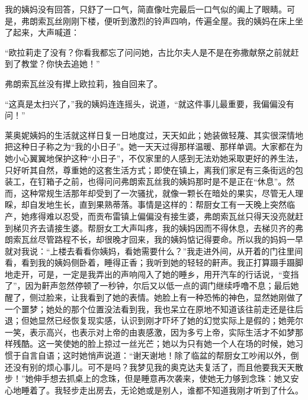 \par 我的姨妈没有回答，只舒了一口气，简直像吐完最后一口气似的阖上了眼睛。可是，弗朗索瓦丝刚刚下楼，便听到激烈的铃声四响，传遍全屋。我的姨妈在床上坐了起来，大声喊道：
\par “欧拉莉走了没有？你看我都忘了问问她，古比尔夫人是不是在弥撒献祭之前就赶到了教堂？你快去追她！”
\par 弗朗索瓦丝没有撵上欧拉莉，独自回来了。
\par “这真是太扫兴了，”我的姨妈连连摇头，说道，“就这件事儿最重要，我偏偏没有问！”
\par 莱奥妮姨妈的生活就这样日复一日地度过，天天如此；她装做轻蔑、其实很深情地把这种日子称之为“我的小日子”。她一天天过得那样温暖、那样单调。大家都在为她小心翼翼地保护这种“小日子”，不仅家里的人感到无法劝她采取更好的养生法，只好听其自然，尊重她的这套生活方式；即使在镇上，离我们家足有三条街远的包装工，在钉箱子之前，也得问问弗朗索瓦丝我的姨妈那时是不是正在“休息”。然而，这种常规生活那年却受到了一次骚扰，就像一颗长在暗处的果实，尽管无人理睬，却自发地生长，直到果熟蒂落。事情是这样的：帮厨女工有一天晚上突然临产，她疼得难以忍受，而贡布雷镇上偏偏没有接生婆，弗朗索瓦丝只得天没亮就赶到梯贝齐去请接生婆。帮厨女工大声叫疼，我的姨妈因而不得休息，去梯贝齐的弗朗索瓦丝尽管路程不长，却很晚才回来，我的姨妈惦记得要命。所以我的妈妈一早就对我说：“上楼去看看你姨妈，看她需要什么？”我走进外间，从开着的门往里间看，看到我的姨妈侧卧着，睡得正香；我听到她的轻轻的鼾声。我正打算蹑手蹑脚地走开，可是，一定是我弄出的声响闯入了她的睡乡，用开汽车的行话说，“变挡了”，因为鼾声忽然停顿了一秒钟，尔后又以低一点的调门继续呼噜不息；最后她醒了，侧过脸来，让我看到了她的表情。她脸上有一种恐怖的神色，显然她刚做了一个噩梦；她处的那个位置没法看到我，我也呆立在原地不知道该往前走还是往后退；但她显然已经恢复现实感，认识到刚才吓坏了她的幻觉实际上是假的；她莞尔一笑，表示高兴，也表示对上帝的由衷感激，因为多亏上帝，实际生活才不如梦那样残酷。这一笑使她的脸上掠过一丝光芒；她以为只有她一个人在场的时候，她习惯于自言自语；这时她悄声说道：“谢天谢地！除了临盆的帮厨女工吵闹以外，倒还没有别的烦心事儿。可不是吗？我梦见我的奥克达夫复活了，而且他要我天天散步！”她伸手想去抓桌上的念珠，但是睡意再次袭来，使她无力够到念珠：她又安心地睡着了。我轻步走出房去，无论她或是别人，谁都不知道我刚才听到了什么。
